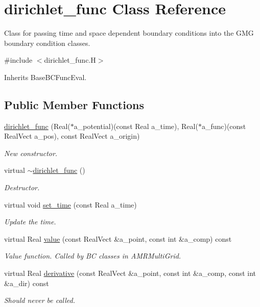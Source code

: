 \hypertarget{classdirichlet__func}{}\section{dirichlet\+\_\+func Class Reference}
\label{classdirichlet__func}


Class for passing time and space dependent boundary conditions into the G\+MG boundary condition classes.  




{\ttfamily \#include $<$dirichlet\+\_\+func.\+H$>$}



Inherits Base\+B\+C\+Func\+Eval.

\subsection*{Public Member Functions}
\begin{DoxyCompactItemize}
\item 
\hyperlink{classdirichlet__func_a2911e9b88feb8927159a8e9e3e654086}{dirichlet\+\_\+func} (Real($\ast$a\+\_\+potential)(const Real a\+\_\+time), Real($\ast$a\+\_\+func)(const Real\+Vect a\+\_\+pos), const Real\+Vect a\+\_\+origin)
\begin{DoxyCompactList}\small\item\em New constructor. \end{DoxyCompactList}\item 
virtual \hyperlink{classdirichlet__func_a8e6d60b5b42aee0e6c8a62c29a8d1c9e}{$\sim$dirichlet\+\_\+func} ()
\begin{DoxyCompactList}\small\item\em Destructor. \end{DoxyCompactList}\item 
virtual void \hyperlink{classdirichlet__func_aa1bde58fbf9d535693077cf803c300a7}{set\+\_\+time} (const Real a\+\_\+time)
\begin{DoxyCompactList}\small\item\em Update the time. \end{DoxyCompactList}\item 
virtual Real \hyperlink{classdirichlet__func_abdd1b80efa098e40591d5eeca5a23696}{value} (const Real\+Vect \&a\+\_\+point, const int \&a\+\_\+comp) const 
\begin{DoxyCompactList}\small\item\em Value function. Called by BC classes in A\+M\+R\+Multi\+Grid. \end{DoxyCompactList}\item 
virtual Real \hyperlink{classdirichlet__func_af3cf912bfb0faef5f6f18c08fda3b180}{derivative} (const Real\+Vect \&a\+\_\+point, const int \&a\+\_\+comp, const int \&a\+\_\+dir) const 
\begin{DoxyCompactList}\small\item\em Should never be called. \end{DoxyCompactList}\end{DoxyCompactItemize}

